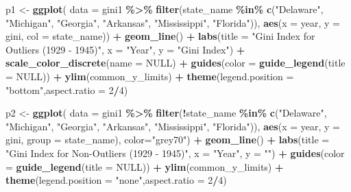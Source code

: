 \documentclass[11pt,a4paper,]{article}
\newenvironment{Shaded}{\begin{snugshade}}{\end{snugshade}}
\newcommand{\AttributeTok}[1]{\textcolor[rgb]{0.13,0.29,0.53}{#1}}
\newcommand{\ConstantTok}[1]{\textcolor[rgb]{0.56,0.35,0.01}{#1}}
\newcommand{\DecValTok}[1]{\textcolor[rgb]{0.00,0.00,0.81}{#1}}
\newcommand{\FunctionTok}[1]{\textcolor[rgb]{0.13,0.29,0.53}{\textbf{#1}}}
\newcommand{\NormalTok}[1]{#1}
\newcommand{\OtherTok}[1]{\textcolor[rgb]{0.56,0.35,0.01}{#1}}
\newcommand{\SpecialCharTok}[1]{\textcolor[rgb]{0.81,0.36,0.00}{\textbf{#1}}}
\newcommand{\StringTok}[1]{\textcolor[rgb]{0.31,0.60,0.02}{#1}}
\begin{document}
\begin{Shaded}
\begin{Highlighting}[]
\NormalTok{p1 }\OtherTok{\textless{}{-}} \FunctionTok{ggplot}\NormalTok{(}
  \AttributeTok{data =}\NormalTok{ gini1 }\SpecialCharTok{\%\textgreater{}\%}
    \FunctionTok{filter}\NormalTok{(state\_name }\SpecialCharTok{\%in\%} \FunctionTok{c}\NormalTok{(}\StringTok{"Delaware"}\NormalTok{, }\StringTok{"Michigan"}\NormalTok{, }\StringTok{"Georgia"}\NormalTok{, }\StringTok{"Arkansas"}\NormalTok{, }\StringTok{"Mississippi"}\NormalTok{, }\StringTok{"Florida"}\NormalTok{)),}
  \FunctionTok{aes}\NormalTok{(}\AttributeTok{x =}\NormalTok{ year, }\AttributeTok{y =}\NormalTok{ gini, }\AttributeTok{col =}\NormalTok{ state\_name)) }\SpecialCharTok{+}
  \FunctionTok{geom\_line}\NormalTok{() }\SpecialCharTok{+}
  \FunctionTok{labs}\NormalTok{(}\AttributeTok{title =} \StringTok{"Gini Index for Outliers (1929 {-} 1945)"}\NormalTok{,}
       \AttributeTok{x =} \StringTok{"Year"}\NormalTok{, }\AttributeTok{y =} \StringTok{"Gini Index"}\NormalTok{) }\SpecialCharTok{+}
  \FunctionTok{scale\_color\_discrete}\NormalTok{(}\AttributeTok{name =} \ConstantTok{NULL}\NormalTok{) }\SpecialCharTok{+}  
  \FunctionTok{guides}\NormalTok{(}\AttributeTok{color =} \FunctionTok{guide\_legend}\NormalTok{(}\AttributeTok{title =} \ConstantTok{NULL}\NormalTok{)) }\SpecialCharTok{+}  
  \FunctionTok{ylim}\NormalTok{(common\_y\_limits) }\SpecialCharTok{+}
  \FunctionTok{theme}\NormalTok{(}\AttributeTok{legend.position =} \StringTok{"bottom"}\NormalTok{,}\AttributeTok{aspect.ratio =} \DecValTok{2}\SpecialCharTok{/}\DecValTok{4}\NormalTok{)}

\NormalTok{p2 }\OtherTok{\textless{}{-}} \FunctionTok{ggplot}\NormalTok{(}
  \AttributeTok{data =}\NormalTok{ gini1 }\SpecialCharTok{\%\textgreater{}\%} 
    \FunctionTok{filter}\NormalTok{(}\SpecialCharTok{!}\NormalTok{state\_name }\SpecialCharTok{\%in\%} \FunctionTok{c}\NormalTok{(}\StringTok{"Delaware"}\NormalTok{, }\StringTok{"Michigan"}\NormalTok{, }\StringTok{"Georgia"}\NormalTok{, }\StringTok{"Arkansas"}\NormalTok{,  }\StringTok{"Mississippi"}\NormalTok{, }\StringTok{"Florida"}\NormalTok{)), }
  \FunctionTok{aes}\NormalTok{(}\AttributeTok{x =}\NormalTok{ year, }\AttributeTok{y =}\NormalTok{ gini, }\AttributeTok{group =}\NormalTok{ state\_name), }\AttributeTok{color=}\StringTok{"grey70"}\NormalTok{) }\SpecialCharTok{+}
  \FunctionTok{geom\_line}\NormalTok{() }\SpecialCharTok{+}
  \FunctionTok{labs}\NormalTok{(}\AttributeTok{title =} \StringTok{"Gini Index for Non{-}Outliers (1929 {-} 1945)"}\NormalTok{,}
       \AttributeTok{x =} \StringTok{"Year"}\NormalTok{, }\AttributeTok{y =} \StringTok{""}\NormalTok{) }\SpecialCharTok{+}
  \FunctionTok{guides}\NormalTok{(}\AttributeTok{color =} \FunctionTok{guide\_legend}\NormalTok{(}\AttributeTok{title =} \ConstantTok{NULL}\NormalTok{)) }\SpecialCharTok{+}  
  \FunctionTok{ylim}\NormalTok{(common\_y\_limits) }\SpecialCharTok{+}
  \FunctionTok{theme}\NormalTok{(}\AttributeTok{legend.position =} \StringTok{"none"}\NormalTok{,}\AttributeTok{aspect.ratio =} \DecValTok{2}\SpecialCharTok{/}\DecValTok{4}\NormalTok{)}


\end{Highlighting}
\end{Shaded}
\end{document}
